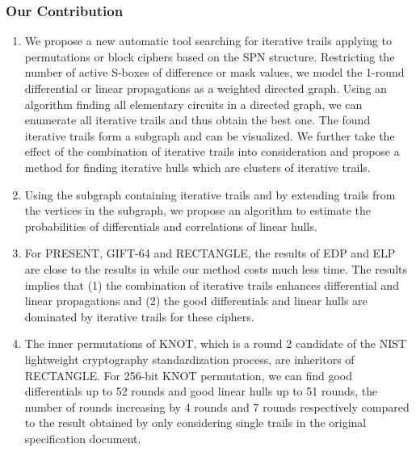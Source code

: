 \subsubsection{Our Contribution}
\begin{enumerate}
    \item We propose a new automatic tool searching for iterative trails applying to permutations or block ciphers based on the SPN structure. Restricting the number of active S-boxes of difference or mask values, we model the 1-round differential or linear propagations as a weighted directed graph. Using an algorithm finding all elementary circuits in a directed graph\cite{J75}, we can enumerate all iterative trails and thus obtain the best one. The found iterative trails form a subgraph and can be visualized. We further take the effect of the combination of iterative trails into consideration and propose a method for finding iterative hulls which are clusters of iterative trails. 
    \item Using the subgraph containing iterative trails and by extending trails from the vertices in the subgraph, we propose an algorithm to estimate the probabilities of differentials and correlations of linear hulls. 
    \item For PRESENT, GIFT-64 and RECTANGLE, the results of EDP and ELP are close to the results in \cite{HV18} while our method costs much less time. The results implies that (1) the combination of iterative trails enhances differential and linear propagations and (2) the good differentials and linear hulls are dominated by iterative trails for these ciphers.
    \item The inner permutations of KNOT, which is a round 2 candidate of the NIST lightweight cryptography standardization process, are inheritors of RECTANGLE. For 256-bit KNOT permutation, we can find good differentials up to 52 rounds and good linear hulls up to 51 rounds, the number of rounds increasing by 4 rounds and 7 rounds respectively compared to the result obtained by only considering single trails in the original specification document. 

\end{enumerate}
